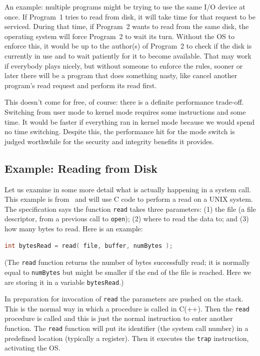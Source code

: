 An example: multiple programs might be trying to use the same I/O device at once. If Program~1 tries to read from disk, it will take time for that request to be serviced. During that time, if Program~2 wants to read from the same disk, the operating system will force Program~2 to wait its turn. Without the OS to enforce this, it would be up to the author(s) of Program~2 to check if the disk is currently in use and to wait patiently for it to become available. That may work if everybody plays nicely, but without someone to enforce the rules, sooner or later there will be a program that does something nasty, like cancel another program's read request and perform its read first.

This doesn't come for free, of course: there is a definite performance trade-off. Switching from user mode to kernel mode requires some instructions and some time. It would be faster if everything ran in kernel mode because we would spend no time switching. Despite this, the performance hit for the mode switch is judged worthwhile for the security and integrity benefits it provides.

\subsection*{Example: Reading from Disk}
Let us examine in some more detail what is actually happening in a 
system call. This example is from~\cite{mos} and will use C code to 
perform a read on a UNIX system. The specification says the function 
\texttt{read} takes three parameters: (1) the file (a file 
descriptor, from a previous call to \texttt{open}); (2) where to read 
the data to; and (3) how many bytes to read. Here is an example: 

\begin{lstlisting}[language=C]
int bytesRead = read( file, buffer, numBytes );
\end{lstlisting}

(The \texttt{read} function returns the number of bytes successfully read; it is normally equal to \texttt{numBytes} but might be smaller if the end of the file is reached. Here we are storing it in a variable \texttt{bytesRead}.)

In preparation for invocation of \texttt{read} the parameters are pushed on the stack. This is the normal way in which a procedure is called in C(++). Then the \texttt{read} procedure is called and this is just the normal instruction to enter another function. The \texttt{read} function will put its identifier (the system call number) in a predefined location (typically a register). Then it executes the \texttt{trap} instruction, activating the OS.


